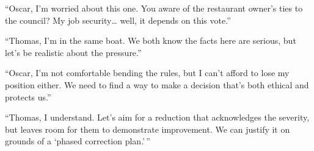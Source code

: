 \item[\normalfont\textit{Thomas Okwu:}] ``Oscar, I'm worried about this one. You aware of the restaurant owner's ties to the council? My job security\ldots{} well, it depends on this vote.''
\item[\normalfont\textit{Oscar Wali:}] ``Thomas, I'm in the same boat. We both know the facts here are serious, but let's be realistic about the pressure.''
\item[\normalfont\textit{Thomas Okwu:}] ``Oscar, I'm not comfortable bending the rules, but I can't afford to lose my position either. We need to find a way to make a decision that's both ethical and protects us.''
\item[\normalfont\textit{Oscar Wali:}] ``Thomas, I understand. Let's aim for a reduction that acknowledges the severity, but leaves room for them to demonstrate improvement. We can justify it on grounds of a `phased correction plan.'\,''%
